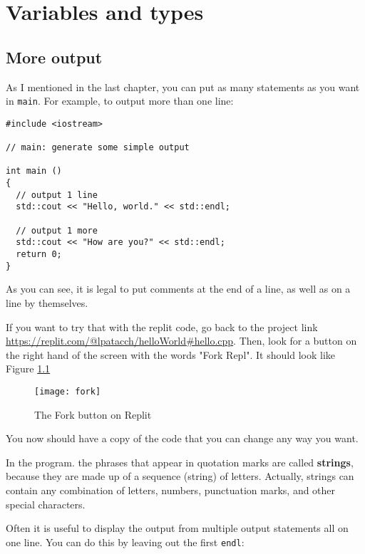 

\chapter{Variables and types}

\section{More output}

As I mentioned in the last chapter, you can put as many statements as
you want in {\tt main}.  For example, to output more than one line:

\begin{lstlisting}[frame=single]
#include <iostream>

// main: generate some simple output

int main ()
{
  // output 1 line
  std::cout << "Hello, world." << std::endl; 
  
  // output 1 more
  std::cout << "How are you?" << std::endl;  
  return 0;
}
\end{lstlisting}

As you can see, it is legal to put comments at the
end of a line, as well as on a line by themselves.

If you want to try that with the replit code, go back to the project link 
\url{https://replit.com/@lpatacch/helloWorld#hello.cpp}. Then, look for a button on the right hand of the screen with the words "Fork Repl". It should look like Figure \ref{fig:fork}
\begin{figure}
    \centering
    \texttt{[image: fork]}
    \caption{The Fork button on Replit}
    \label{fig:fork}
\end{figure}
You now should have a copy of the code that you can change any way you want.


In the program. the phrases that appear in quotation marks are called {\bf strings},
because they are made up of a sequence (string) of letters.  Actually,
strings can contain any combination of letters, numbers, punctuation
marks, and other special characters.


Often it is useful to display the output from multiple output
statements all on one line.  You can do this by leaving out
the first {\tt endl}:

